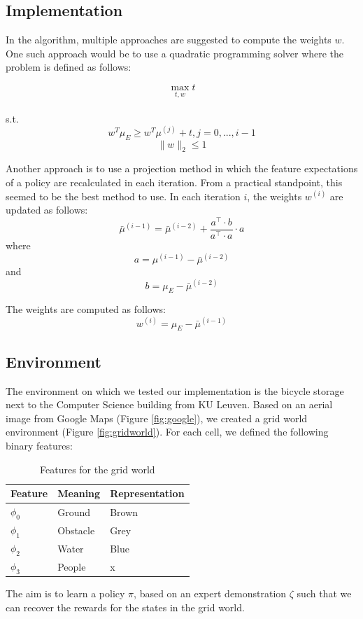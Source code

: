 \documentclass[10pt,a4paper,twocolumn]{article}
\begin{document}
\subsection{Implementation}
In the algorithm, multiple approaches are suggested to compute the weights $w$. One such approach would be to use a quadratic programming solver where the problem is defined as follows:

$$\max\limits_{t, w} t$$\\
s.t. $$w^T \mu_E \geq w^T \mu^{(j)} + t, j= 0,...,i-1$$
$$\|w\|_2 \leq 1$$

Another approach is to use a projection method in which the feature expectations of a policy are recalculated in each iteration. From a practical standpoint, this seemed to be the best method to use. In each iteration $i$, the weights $w^{(i)}$ are updated as follows:\\
$$\bar{\mu}^{(i-1)} = \bar{\mu}^{(i-2)} + \frac
	{a^\intercal\cdot b}
	{a^\intercal\cdot a}
	\cdot
	a$$
where 
$$a = \mu^{(i-1)}-\bar{\mu}^{(i-2)}$$
and
$$b = \mu_E - \bar{\mu}^{(i-2)}$$

The weights are computed as follows:
$$w^{(i)} = \mu_E - \bar{\mu}^{(i-1)}$$


\subsection{Environment}
The environment on which we tested our implementation is the bicycle storage next to the Computer Science building from KU Leuven. Based on an aerial image from Google Maps (Figure \ref{fig:google}), we created a grid world environment (Figure \ref{fig:gridworld}). For each cell, we defined the following binary features:

\begin{table}[h]
\centering
\begin{tabular}{|l|l|l|}
	\hline
	Feature		&	Meaning		&	Representation\\\hline
	$\phi_0$		&	Ground		&	Brown\\
	$\phi_1$		&	Obstacle		&	Grey\\
	$\phi_2$		&	Water		&	Blue\\
	$\phi_3$		&	People		&	x\\
	\hline
\end{tabular}
\caption{Features for the grid world}
\end{table}

The aim is to learn a policy $\pi$, based on an expert demonstration $\zeta$ such that we can recover the rewards for the states in the grid world.
\end{document}
